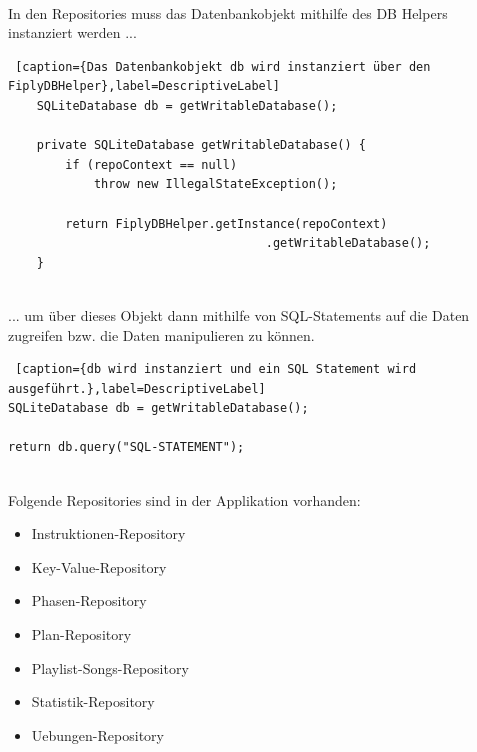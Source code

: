 \documentclass[FIPLY_base.tex]{subfiles}
\begin{document}
\ \\
In den Repositories muss das Datenbankobjekt mithilfe des DB Helpers instanziert werden ...
\ \\
\begin{lstlisting} [caption={Das Datenbankobjekt db wird instanziert über den FiplyDBHelper},label=DescriptiveLabel]
    SQLiteDatabase db = getWritableDatabase();

    private SQLiteDatabase getWritableDatabase() {
        if (repoContext == null) 
            throw new IllegalStateException();
	  
        return FiplyDBHelper.getInstance(repoContext)
			      	  		        .getWritableDatabase();
    }
\end{lstlisting}
\ \\
... um über dieses Objekt dann mithilfe von SQL-Statements auf die Daten zugreifen bzw. die Daten manipulieren zu können.
\ \\
\begin{lstlisting} [caption={db wird instanziert und ein SQL Statement wird ausgeführt.},label=DescriptiveLabel]
SQLiteDatabase db = getWritableDatabase();

return db.query("SQL-STATEMENT");
\end{lstlisting}

\ \\
Folgende Repositories sind in der Applikation vorhanden:
\begin{itemize}
\item Instruktionen-Repository
\item Key-Value-Repository
\item Phasen-Repository
\item Plan-Repository
\item Playlist-Songs-Repository
\item Statistik-Repository
\item Uebungen-Repository
\end{itemize}

\newpage
\end{document}
